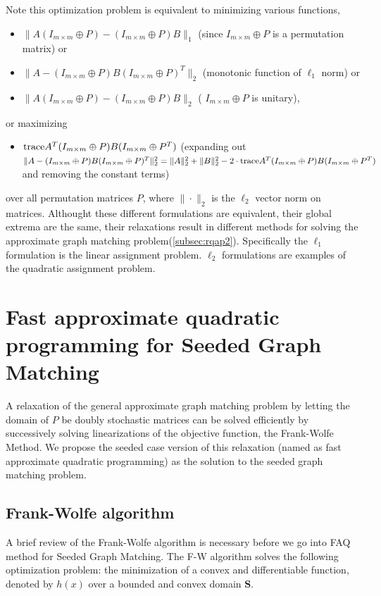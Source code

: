 \documentclass[12pt,oneside,final]{thesis}\usepackage[]{graphicx}\usepackage[]{color}
\begin{document}
   
 Note this optimization problem is equivalent to minimizing various functions, \eg
 \begin{itemize}
\item $\|A(I_{m \times m}\oplus P)-(I_{m \times m}\oplus P)B\|_1$ (since $I_{m \times m}\oplus P$ is a permutation matrix) or
\item $\|A-(I_{m \times m}\oplus P)B(I_{m \times m}\oplus P)^T\|_2$ (monotonic function of $\ell_1$ norm) or
\item  $\|A(I_{m \times m}\oplus P)-(I_{m \times m}\oplus P)B\|_2$ ( $I_{m \times m}\oplus P$ is unitary), 
 \end{itemize}
or maximizing 
\begin{itemize}
\item $\textup{trace} {A^T(I_{m \times m}\oplus P)B(I_{m \times m}\oplus P^T)}$ (expanding out $\|A-(I_{m \times m}\oplus P)B(I_{m \times m}\oplus P)^T\|_2^2=
\|A\|_2^2 + \|B\|_2^2
- 2 \cdot \textup{trace}{A^T(I_{m \times m}\oplus P)B(I_{m \times m}\oplus P^T)}$  and removing the constant terms) \label{item:squareofdist_eq_tr_crossprod}
\end{itemize}
over all permutation matrices $P$,
where $\| \cdot \|_2$ is the $\ell_2$ vector norm on matrices.   Althought these different formulations  are equivalent, \ie  their global extrema are the same, their relaxations result in different methods for solving the approximate graph matching problem(\autoref{subsec:rqap2}). Specifically the $\ell_1$ formulation is the  linear assignment problem. $\ell_2$ formulations are examples of the quadratic assignment problem.

 
\section{Fast approximate quadratic programming for Seeded Graph Matching}


A relaxation of the general   approximate graph matching problem by letting the  domain of $P$ be doubly stochastic matrices can be solved efficiently by successively solving linearizations of the objective function, the Frank-Wolfe Method. We propose the seeded case version of this relaxation (named as fast approximate quadratic programming)  as the solution to the seeded graph matching problem.
\subsection{Frank-Wolfe algorithm}
A brief review of the Frank-Wolfe algorithm is necessary before we go into FAQ method for Seeded Graph Matching. The F-W algorithm solves the following optimization problem: the minimization of a convex and differentiable function, denoted by $h(x)$ 
over a bounded and convex domain $\mathbf{S}$. 
\end{document}
